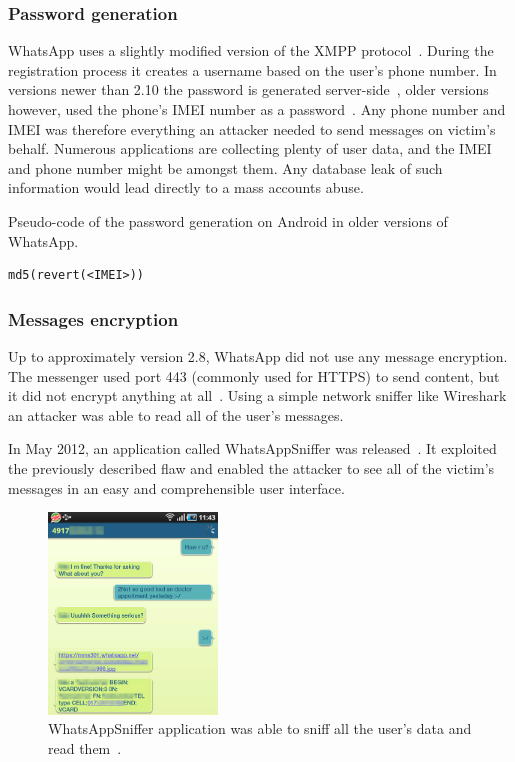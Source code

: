 \documentclass[thesis=M,english]{FITthesis}[2012/10/20]
\begin{document}
\subsubsection{Password generation}

WhatsApp uses a slightly modified version of the XMPP protocol~\cite{whatsapp-xmpp}. During the registration process it creates a username based on the user's phone number. In versions newer than 2.10 the password is generated server-side~\cite{whatsapp-imei}, older versions however, used the phone's IMEI number as a password~\cite{whatsapp-imei, whatsapp-imei2}. Any phone number and IMEI was therefore everything an attacker needed to send messages on victim's behalf. Numerous applications are collecting plenty of user data, and the IMEI and phone number might be amongst them. Any database leak of such information would lead directly to a mass accounts abuse.

\begin{listing}[htb]
\caption{Pseudo-code of the password generation on Android in older versions of WhatsApp.}
\begin{verbatim}
md5(revert(<IMEI>))
\end{verbatim}
\label{lst:status-whatsapp-password}
\end{listing}


\subsubsection{Messages encryption}

Up to approximately version 2.8, WhatsApp did not use any message encryption. The messenger used port 443 (commonly used for HTTPS) to send content, but it did not encrypt anything at all~\cite{whatsapp-plaintext}. Using a simple network sniffer like Wireshark an attacker was able to read all of the user's messages.

In May 2012, an application called WhatsAppSniffer was released~\cite{whatsapp-sniffer, whatsapp-sniffer2}. It exploited the previously described flaw and enabled the attacker to see all of the victim's messages in an easy and comprehensible user interface.

\begin{figure}[htb]
	\centering
	\includegraphics[width=0.4\textwidth]{whatsapp-sniffer.png}
	\caption[WhatsAppSniffer]{WhatsAppSniffer application was able to sniff all the user's data and read them~\cite{whatsapp-sniffer2}.}
	\label{img:whatsapp_sniffer}
\end{figure}
\end{document}
